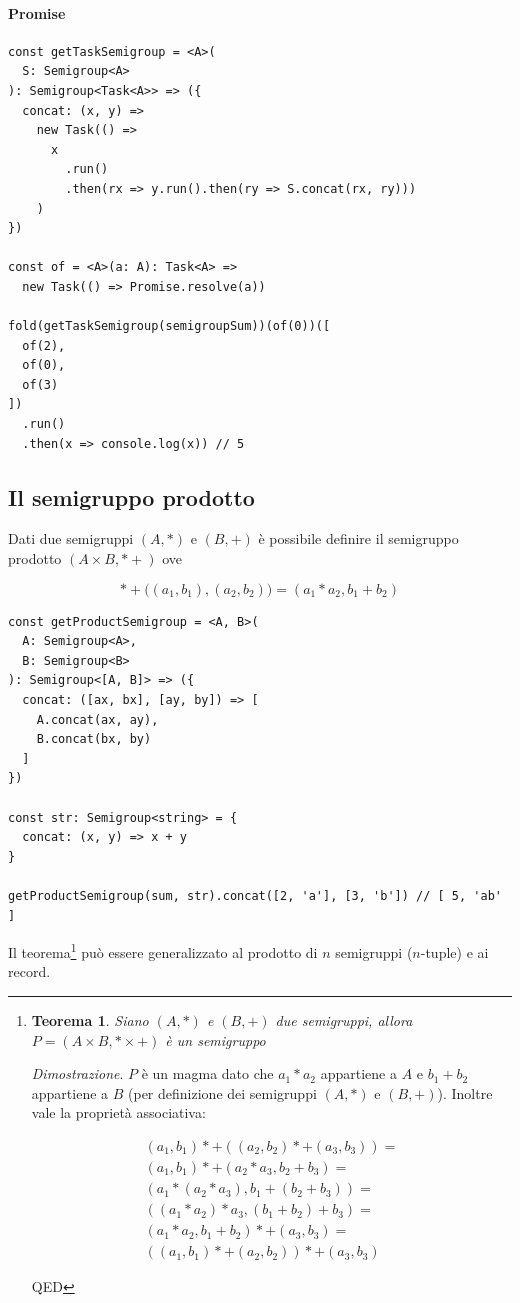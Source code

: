 \documentclass[12pt]{article}
\newtheorem{theorem}{Teorema}[section]
\begin{document}
\paragraph{Promise}

\begin{verbatim}
const getTaskSemigroup = <A>(
  S: Semigroup<A>
): Semigroup<Task<A>> => ({
  concat: (x, y) =>
    new Task(() =>
      x
        .run()
        .then(rx => y.run().then(ry => S.concat(rx, ry)))
    )
})

const of = <A>(a: A): Task<A> =>
  new Task(() => Promise.resolve(a))

fold(getTaskSemigroup(semigroupSum))(of(0))([
  of(2),
  of(0),
  of(3)
])
  .run()
  .then(x => console.log(x)) // 5
\end{verbatim}

\subsection{Il semigruppo prodotto}

Dati due semigruppi $(A, *)$ e $(B, +)$ è possibile definire il semigruppo prodotto $(A \times B, *+)$ ove

$$
*+\Big((a_1, b_1), (a_2, b_2)\Big) = (a_1 * a_2, b_1 + b_2)
$$

\begin{verbatim}
const getProductSemigroup = <A, B>(
  A: Semigroup<A>,
  B: Semigroup<B>
): Semigroup<[A, B]> => ({
  concat: ([ax, bx], [ay, by]) => [
    A.concat(ax, ay),
    B.concat(bx, by)
  ]
})

const str: Semigroup<string> = {
  concat: (x, y) => x + y
}

getProductSemigroup(sum, str).concat([2, 'a'], [3, 'b']) // [ 5, 'ab' ]
\end{verbatim}

Il teorema\footnote{
\begin{theorem}
Siano $(A, *)$ e $(B, +)$ due semigruppi, allora $P = (A \times B, * \times +)$ è un semigruppo
\end{theorem}

\emph{Dimostrazione}. $P$ è un magma dato che $a_1 * a_2$ appartiene a $A$ e $b_1 + b_2$ appartiene a $B$ (per definizione dei semigruppi $(A, *)$ e $(B, +)$).
Inoltre vale la proprietà associativa:

\begin{eqnarray}
(a_1, b_1) *+ ((a_2, b_2) *+ (a_3, b_3)) = \\
(a_1, b_1) *+ (a_2 * a_3, b_2 + b_3) = \\
(a_1 * (a_2 * a_3), b_1 + (b_2 + b_3)) = \\
((a_1 * a_2) * a_3, (b_1 + b_2) + b_3) = \\
(a_1 * a_2, b_1 + b_2) *+ (a_3, b_3) = \\
((a_1, b_1) *+ (a_2, b_2)) *+ (a_3, b_3)
\end{eqnarray}

QED

} può essere generalizzato al prodotto di $n$ semigruppi ($n$-tuple) e ai record.
\end{document}
